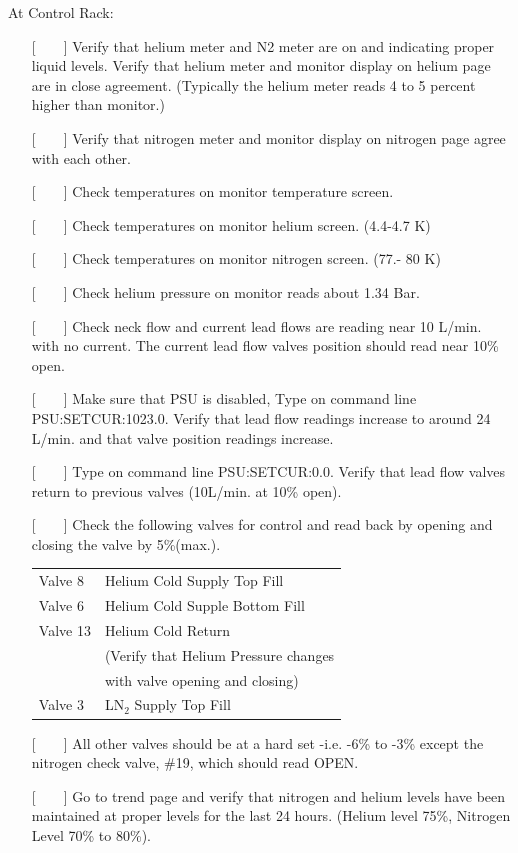 {\noindent At Control Rack:

\begin{itemize}
\item[{[~~~~]}]{Verify that helium meter and N2 meter are on and indicating
proper liquid levels. Verify that helium meter and monitor display on helium
page are in close agreement.  (Typically the helium meter reads 4 to 5 percent
higher than monitor.)}
\item[{[~~~~]}]{Verify that nitrogen meter and monitor display on nitrogen
page agree with each other.}
\item[{[~~~~]}]{Check temperatures on monitor temperature screen.}
\item[{[~~~~]}]{Check temperatures on monitor helium screen. (4.4-4.7 K)}
\item[{[~~~~]}]{Check temperatures on monitor nitrogen screen. (77.- 80 K)}
\item[{[~~~~]}]{Check helium pressure on monitor reads about 1.34 Bar.}
\item[{[~~~~]}]{Check neck flow and current lead flows are reading near 10
L/min. with no current.  The current lead flow valves position should read
near 10\% open.}
\item[{[~~~~]}]{Make sure that PSU is disabled, Type on command line
PSU:SETCUR:1023.0.  Verify that lead flow readings increase to around 24
L/min. and that valve position readings increase.}
\item[{[~~~~]}]{Type on command line PSU:SETCUR:0.0. Verify that lead flow
valves return to previous valves (10L/min. at 10\% open).}
\item[{[~~~~]}]{Check the following valves for control and read back by opening
and closing the valve by 5\%(max.).}

\begin{center}
  \begin{tabular}{ll}
Valve 8	& Helium Cold Supply Top Fill		\\
Valve 6	& Helium Cold Supple Bottom Fill	\\
Valve 13& Helium Cold Return			\\
	& (Verify that Helium Pressure changes  \\
        &  with valve opening and closing)      \\
Valve 3	& LN$_2$ Supply Top Fill		\\
  \end{tabular}
\end{center}
\item[{[~~~~]}]{All other valves should be at a hard set -i.e. -6\% to
-3\% except the nitrogen check valve, \#19, which should read OPEN.}
\item[{[~~~~]}]{Go to trend page and verify that nitrogen and helium levels
have been maintained at proper levels for the last 24
hours.  (Helium level 75\%, Nitrogen Level 70\% to 80\%).}
\end{itemize}


}
